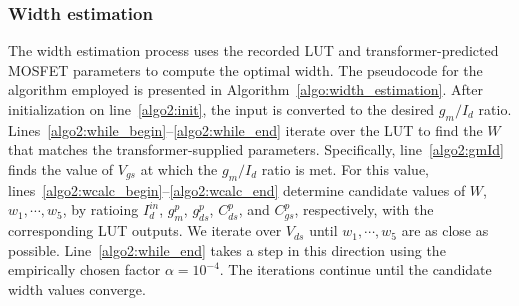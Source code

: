 \subsubsection{\textbf{Width estimation}} 

The width estimation process uses the recorded LUT and transformer-predicted MOSFET parameters to compute the optimal width. The pseudocode for the algorithm employed is presented in Algorithm~\ref{algo:width_estimation}. 
After initialization on line~\ref{algo2:init}, the input is converted to the desired $g_m/I_d$ ratio.  Lines~\ref{algo2:while_begin}--\ref{algo2:while_end} iterate over the LUT to find the $W$ that matches the transformer-supplied parameters. Specifically, line~\ref{algo2:gmId} finds the value of $V_{gs}$ at which the $g_m/I_d$ ratio is met. For this value, lines~\ref{algo2:wcalc_begin}--\ref{algo2:wcalc_end} determine candidate values of $W$, $w_1, \cdots, w_5$, by ratioing $I_d^{in}$, $g_m^p$, $g_{ds}^p$, $C_{ds}^p$, and $C_{gs}^p$, respectively, with the corresponding LUT outputs. We iterate over $V_{ds}$ until $w_1, \cdots, w_5$ are as close as possible. Line~\ref{algo2:while_end} takes a step in this direction using the empirically chosen factor $\alpha = 10^{-4}$. The iterations continue until the candidate width values converge.



